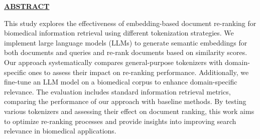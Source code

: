 
\thispagestyle{empty}
\begin{center}
{\underline{\bf\Large ABSTRACT }}\\
\par\vspace{5mm}
\end{center}

This study explores the effectiveness of embedding-based document re-ranking for biomedical information retrieval using different tokenization strategies. We implement large language models (LLMs) to generate semantic embeddings for both documents and queries and re-rank documents based on similarity scores. Our approach systematically compares general-purpose tokenizers with domain-specific ones to assess their impact on re-ranking performance. Additionally, we fine-tune an LLM model on a biomedical corpus to enhance domain-specific relevance. The evaluation includes standard information retrieval metrics, comparing the performance of our approach with baseline methods. By testing various tokenizers and assessing their effect on document ranking, this work aims to optimize re-ranking processes and provide insights into improving search relevance in biomedical applications.

